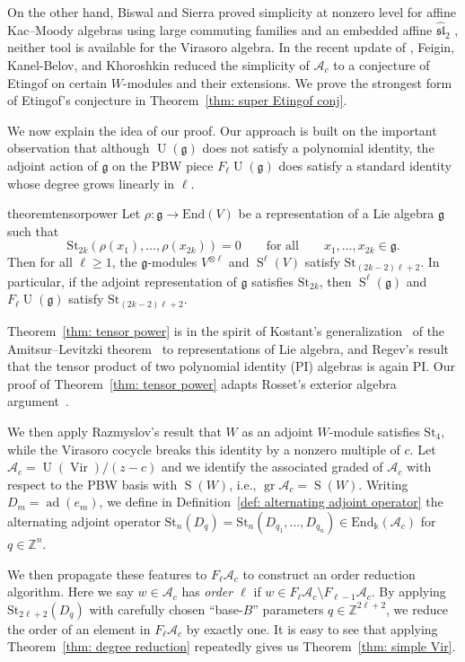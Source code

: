 \documentclass[12pt]{amsart}
\theoremstyle{plain}
\theoremstyle{definition}
\numberwithin{equation}{theorem}
\newcommand{\kk}{\Bbbk}
\newcommand{\Vir}{\operatorname{Vir}}
\newcommand{\Sa}{\operatorname{S}}
\newcommand{\UU}{\operatorname{U}}
\newcommand{\ad}{\operatorname{ad}}
\newcommand{\gr}{\operatorname{gr}}
\newcommand{\ZZ}{\mathbb{Z}}
\newcommand{\mf}[1]{\mathfrak{#1}}
\newcommand{\calA}{\mathcal A}
\newcommand{\g}{\mathfrak{g}}
\newcommand{\St}{\mathrm{St}}
\newcommand{\End}{\mathrm{End}}
\begin{document}
On the other hand, Biswal and Sierra proved simplicity at nonzero level for affine Kac--Moody algebras using large commuting families and an embedded affine $\widehat{\mf{sl}}_2$ \cite{BiswalSierra25}, neither tool is available for the Virasoro algebra. In the recent update of \cite{FeiginKanelKhoroshkin}, Feigin,  Kanel-Belov, and Khoroshkin reduced the simplicity of $\calA_c$ to a conjecture of Etingof on certain $W$-modules and their extensions. We prove the strongest form of Etingof's conjecture in Theorem~\ref{thm: super Etingof conj}.

We now explain the idea of our proof. Our approach is built on the important observation that although $\UU(\g)$ does not satisfy a polynomial identity, the adjoint action of $\g$ on the PBW piece $F_\ell \UU(\g)$ does satisfy a standard identity whose degree grows linearly in $\ell$. 
\begin{restatable}{theorem}{tensorpower}\label{thm: tensor power}
    Let $\rho: \g \to \End(V)$ be a representation of a Lie algebra $\g$ such that 
    \[\St_{2k}(\rho(x_1), \dots, \rho(x_{2k})) = 0 \qquad \text{for all}\qquad x_1, \dots, x_{2k} \in \g.\]
    Then for all $\ell \geq 1$, the $\g$-modules $V^{\otimes \ell}$ and $\Sa^\ell(V)$ satisfy $\St_{(2k-2)\ell+2}$. In particular, if the adjoint representation of $\g$ satisfies $\St_{2k}$, then $\Sa^\ell(\g)$ and $F_\ell \UU(\mathfrak g)$ satisfy $\St_{(2k-2)\ell+2}$.
\end{restatable}
Theorem~\ref{thm: tensor power} is in the spirit of Kostant's generalization~\cite{Kostant81} of the Amitsur--Levitzki theorem~\cite{AmitsurLevitzki50} to representations of Lie algebra, and Regev's result~\cite{Regev72} that the tensor product of two polynomial identity (PI) algebras is again PI. Our proof of Theorem~\ref{thm: tensor power} adapts Rosset's exterior algebra argument~\cite{Rosset76}. 

We then apply Razmyslov's result \cite{Razmyslov85} that $W$ as an adjoint $W$-module satisfies $\St_4$, while the Virasoro cocycle breaks this identity by a nonzero multiple of $c$. Let $\calA_c = \UU(\Vir)/(z-c)$ and we identify the associated graded of $\calA_c$ with respect to the PBW basis with $\Sa(W)$, i.e., $\gr \calA_c = \Sa(W)$. Writing $D_m= \ad(e_m)$, we define in Definition~\ref{def: alternating adjoint operator} the alternating adjoint operator $\St_n(D_q)  = \St_n(D_{q_1}, \dots, D_{q_n}) \in \End_\kk (\calA_c)$ for $q \in \ZZ^n$.

We then propagate these features to $F_{\ell} \calA_c$ to construct an order reduction algorithm. Here we say $w \in \calA_c$ has \emph{order $\ell$} if $w \in F_{\ell} \calA_c \setminus F_{\ell-1} \calA_c$. By applying $\St_{2\ell+2}(D_q)$ with carefully chosen ``base-$B$'' parameters $q \in \ZZ^{2\ell+2}$, we reduce the order of an element in $F_{\ell} \calA_c$ by exactly one. It is easy to see that applying Theorem~\ref{thm: degree reduction} repeatedly gives us Theorem~\ref{thm: simple Vir}.
\end{document}
